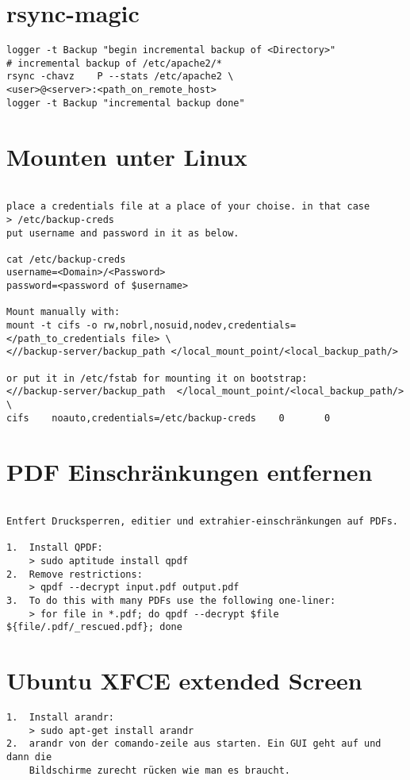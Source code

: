 \documentclass[a4paper,10pt]{report}
\begin{document}
\section{rsync-magic}
\begin{verbatim}
logger -t Backup "begin incremental backup of <Directory>"
# incremental backup of /etc/apache2/*
rsync -chavz	P --stats /etc/apache2 \
<user>@<server>:<path_on_remote_host>
logger -t Backup "incremental backup done"
\end{verbatim}
\pagebreak

\section{Mounten unter Linux}
\begin{verbatim}

place a credentials file at a place of your choise. in that case 
> /etc/backup-creds
put username and password in it as below.

cat /etc/backup-creds
username=<Domain>/<Password>
password=<password of $username>

Mount manually with:
mount -t cifs -o rw,nobrl,nosuid,nodev,credentials=</path_to_credentials file> \
<//backup-server/backup_path </local_mount_point/<local_backup_path/>

or put it in /etc/fstab for mounting it on bootstrap:
<//backup-server/backup_path  </local_mount_point/<local_backup_path/>  \
cifs    noauto,credentials=/etc/backup-creds    0       0
\end{verbatim}

\section{PDF Einschränkungen entfernen}
\begin{verbatim}

Entfert Drucksperren, editier und extrahier-einschränkungen auf PDFs.

1.  Install QPDF:
    > sudo aptitude install qpdf
2.  Remove restrictions:
    > qpdf --decrypt input.pdf output.pdf
3.  To do this with many PDFs use the following one-liner:
    > for file in *.pdf; do qpdf --decrypt $file ${file/.pdf/_rescued.pdf}; done

\end{verbatim}

\section{Ubuntu XFCE extended Screen}
\begin{verbatim}
1.  Install arandr:
    > sudo apt-get install arandr
2.  arandr von der comando-zeile aus starten. Ein GUI geht auf und dann die 
    Bildschirme zurecht rücken wie man es braucht.
\end{verbatim}
\pagebreak
\end{document}
